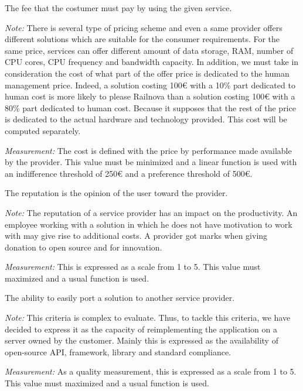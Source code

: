 \documentclass[a4paper,11pt]{article}
\begin{document}
\begin{description}[parsep=10pt,listparindent=\parindent,labelindent=\parindent,font=$\bullet$\ ]
  \item[Cost:] The fee that the costumer must pay by using the given service.
    \par \emph{Note:} There is several type of pricing scheme and even a same provider offers different solutions which are suitable for the consumer requirements. For the same price, services can offer different amount of data storage, RAM, number of CPU cores, CPU frequency and bandwidth capacity. In addition, we must take in consideration the cost of what part of the offer price is dedicated to the human management price. Indeed, a solution costing 100\euro{} with a 10\% part dedicated to human cost is more likely to please Railnova than a solution costing 100\euro{} with a 80\% part dedicated to human cost. Because it supposes that the rest of the price is dedicated to the actual hardware and technology provided. This cost will be computed separately.
    \par \emph{Measurement:} The cost is defined with the price by performance made available by the provider. This value must be minimized and a linear function is used with an indifference threshold of 250\euro{} and a preference threshold of 500\euro.

  \item[Reputation:] The reputation is the opinion of the user toward the provider.
    \par \emph{Note:} The reputation of a service provider has an impact on the productivity. An employee working with a solution in which he does not have motivation to work with may give rise to additional costs. A provider got marks when giving donation to open source and for innovation.
    \par \emph{Measurement:} This is expressed as a scale from 1 to 5. This value must maximized and a usual function is used.
    
  \item[Portability:] The ability to easily port a solution to another service provider.
    \par \emph{Note:} This criteria is complex to evaluate. Thus, to tackle this criteria, we have decided to express it as the capacity of reimplementing the application on a server owned by the customer. Mainly this is expressed as the availability of open-source API, framework, library and standard compliance.
    \par \emph{Measurement:} As a quality measurement, this is expressed as a scale from 1 to 5. This value must maximized and a usual function is used.


\end{description}
\end{document}
